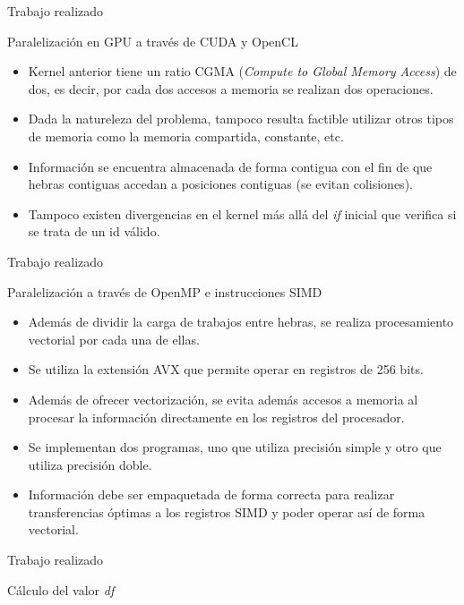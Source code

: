 \begin{frame}{Trabajo realizado}
\begin{block}{Paralelización en GPU a través de CUDA y OpenCL}
\begin{itemize}
  \item Kernel anterior tiene un ratio CGMA (\textit{Compute to Global Memory Access}) de dos, es decir, por cada dos accesos a memoria se realizan dos operaciones.
  \item Dada la natureleza del problema, tampoco resulta factible utilizar otros tipos de memoria como la memoria compartida, constante, etc.
  \item Información se encuentra almacenada de forma contigua con el fin de que hebras contiguas accedan a posiciones contiguas (se evitan colisiones).
  \item Tampoco existen divergencias en el kernel más allá del \textit{if} inicial que verifica si se trata de un id válido.
\end{itemize}
\end{block}
\end{frame}

\begin{frame}{Trabajo realizado}
\begin{block}{Paralelización a través de OpenMP e instrucciones SIMD}
\begin{itemize}
  \item Además de dividir la carga de trabajos entre hebras, se realiza procesamiento vectorial por cada una de ellas.
  \item Se utiliza la extensión AVX que permite operar en registros de 256 bits.
  \item Además de ofrecer vectorización, se evita además accesos a memoria al procesar la información directamente en los registros del procesador.
  \item Se implementan dos programas, uno que utiliza precisión simple y otro que utiliza precisión doble.
  \item Información debe ser empaquetada de forma correcta para realizar transferencias óptimas a los registros SIMD y poder operar así de forma vectorial.
\end{itemize}
\end{block}
\end{frame}

\begin{frame}{Trabajo realizado}
\begin{block}{Cálculo del valor \textit{df}}
\centerline{
      }
\end{block}
\end{frame}

